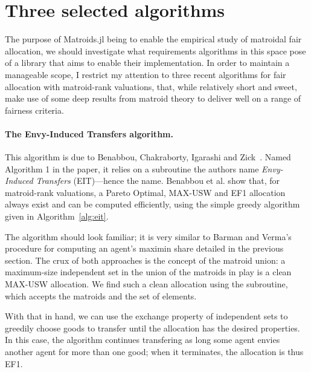 \section{Three selected algorithms}
\label{sec:three-algos}
The purpose of Matroids.jl being to enable the empirical study of matroidal fair allocation, we should investigate what requirements algorithms in this space pose of a library that aims to enable their implementation. In order to maintain a manageable scope, I restrict my attention to three recent algorithms for fair allocation with matroid-rank valuations, that, while relatively short and sweet, make use of some deep results from matroid theory to deliver well on a range of fairness criteria.


\paragraph{The Envy-Induced Transfers algorithm.} This algorithm is due to Benabbou, Chakraborty, Igarashi and Zick~\cite{benabbou-2021}. Named Algorithm 1 in the paper, it relies on a subroutine the authors name \textit{Envy-Induced Transfers} (EIT)---hence the name. Benabbou et al. show that, for matroid-rank valuations, a Pareto Optimal, MAX-USW and EF1 allocation always exist and can be computed efficiently, using the simple greedy algorithm given in Algorithm~\ref{alg:eit}.

The algorithm should look familiar; it is very similar to Barman and Verma's procedure for computing an agent's maximin share detailed in the previous section. The crux of both approaches is the concept of the matroid union: a maximum-size independent set in the union of the matroids in play is a clean MAX-USW allocation. We find such a clean allocation using the  subroutine, which accepts the matroids and the set of elements.


With that in hand, we can use the exchange property of independent sets to greedily choose goods to transfer until the allocation has the desired properties. In this case, the algorithm continues transfering as long some agent envies another agent for more than one good; when it terminates, the allocation is thus EF1.

